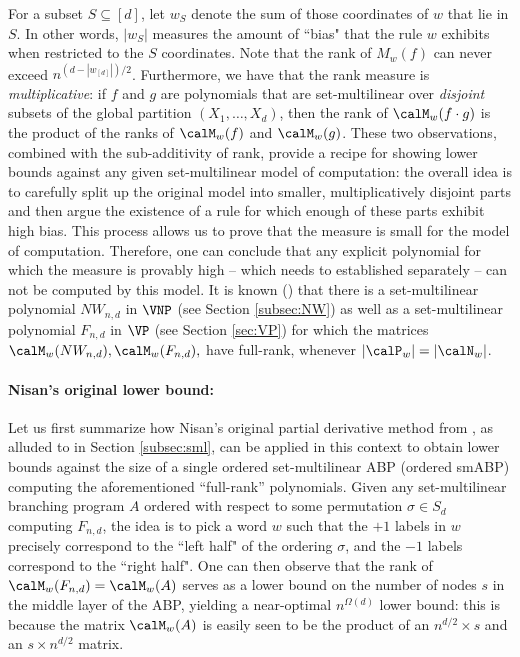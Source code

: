 \documentclass{article}
\begin{document}
For a subset $S\subseteq[d]$, let $w_S$ denote the sum of those coordinates of $w$ that lie in $S$. In other words, $|w_S|$ measures the amount of ``bias" that the rule $w$ exhibits when restricted to the $S$ coordinates. Note that the rank of $M_w(f)$ can never exceed $n^{(d-|w_{[d]}|)/{2}}$. Furthermore, we have that the rank measure is \emph{multiplicative}: if $f$ and $g$ are polynomials that are set-multilinear over \emph{disjoint} subsets of the global partition $(X_1,\ldots, X_d)$, then the rank of $\calM_w(f\cdot g)$ is the product of the ranks of $\calM_w(f)$ and $\calM_w(g)$. These two observations, combined with the sub-additivity of rank, provide a recipe for showing lower bounds against any given set-multilinear model of computation: the overall idea is to carefully split up the original model into smaller, multiplicatively disjoint parts and then argue the existence of a rule for which enough of these parts exhibit high bias. This process allows us to prove that the measure is small for the model of computation. Therefore, one can conclude that any explicit polynomial for which the measure is provably high -- which needs to established separately -- can not be computed by this model.  
It is known (\cite{KushS22,KushS23}) that there is a set-multilinear polynomial 
$NW_{n,d}$ in $\VNP$ (see Section \ref{subsec:NW}) as well as a set-multilinear polynomial $F_{n,d}$ in $\VP$ (see Section \ref{sec:VP}) for which the matrices $\calM_w(NW_{n,d}),\calM_w(F_{n,d}), $ have full-rank, whenever $|\calP_w| = |\calN_w|$.

\paragraph{Nisan's original lower bound:}Let us first summarize how Nisan's original partial derivative method from \cite{Nisan91}, as alluded to in Section \ref{subsec:sml}, can be applied in this context to obtain lower bounds against the size of a single ordered set-multilinear ABP (ordered smABP) computing the aforementioned ``full-rank'' polynomials. Given any set-multilinear branching program $A$ ordered with respect to some permutation $\sigma\in S_d$ computing $F_{n,d}$, the idea is to pick a word $w$ such that the $+1$ labels in $w$ precisely correspond to the ``left half" of the ordering $\sigma$, and the $-1$ labels correspond to the ``right half". One can then observe that the rank of $\calM_w(F_{n,d}) = \calM_w(A)$ serves as a lower bound on the number of nodes $s$ in the middle layer of the ABP, yielding a near-optimal $n^{\Omega(d)}$ lower bound: this is because the matrix $\calM_w(A)$ is easily seen to be the product of an $n^{d/2}\times s$ and an $s\times n^{d/2}$ matrix.
\end{document}
